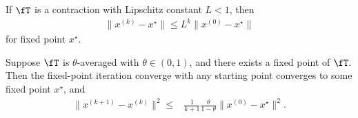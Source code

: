\documentclass{article}
\begin{document}
\begin{remark}
    If $\fT$ is a contraction with Lipschitz constant $L<1$, then
    \begin{align}
        \|x^{(k)} - x^\star\| \leq L^k \|x^{(0)} - x^\star\|
    \end{align}
    for fixed point $x^\star$.
\end{remark}

\begin{theorem}
    Suppose $\fT$ is $\theta$-averaged with $\theta\in(0, 1)$, and there exists a fixed point of $\fT.$
    Then the fixed-point iteration converge with any starting point converges to some fixed point $x^\star$,
    and
    \begin{align}
        \|x^{(k+1)} - x^{(k)}\|^2 \leq& \frac{1}{k+1} \frac{\theta}{1-\theta} \|x^{(0)}- x^\star\|^2.
    \end{align}
\end{theorem}
\end{document}
